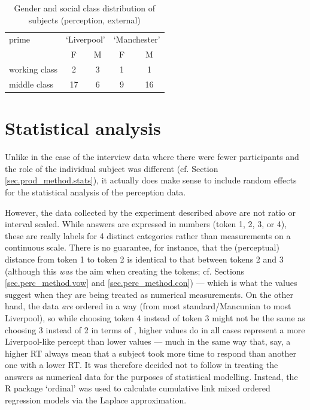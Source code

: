 \begin{table}[h]
	\caption[Gender and {social class} of subjects (perception)]{Gender and {social class} distribution of subjects (perception, external)}
	\label{tab.participants.perception}
	\centering
	\begin{tabular}{lcccc}
		\hline
		prime\is{priming} & \multicolumn{2}{c}{`Liverpool'} & \multicolumn{2}{c}{`Manchester'}\\
		& F & M & F & M\\
		\hline
		working class & 2 & 3 & 1 & 1\\
		middle class & 17 & 6 & 9 & 16\\
		\hline
	\end{tabular}
\end{table}

\section{Statistical analysis}\label{sec.perc_method.stats}

Unlike in the case of the interview data where there were fewer participants and the role of the individual subject was different (cf. Section \ref{sec.prod_method.stats}), it actually does make sense to include random effects for the statistical analysis of the perception data.

However, the data collected by the experiment described above are not ratio or interval scaled.
While answers are expressed in numbers (token 1, 2, 3, or 4), these are really labels for 4 distinct categories rather than measurements on a continuous scale.
There is no guarantee, for instance, that the (perceptual) distance from token 1 to token 2 is identical to that between tokens 2 and 3 (although this \emph{was} the aim when creating the tokens; cf. Sections \ref{sec.perc_method.vow} and \ref{sec.perc_method.con}) --- which is what the values suggest when they are being treated as numerical measurements.
On the other hand, the data \emph{are} ordered in a way (from most standard/Mancunian to most Liverpool), so while choosing token 4 instead of token 3 might not be the same as choosing 3 instead of 2 in terms of , higher values do in all cases represent a more Liverpool-like percept than lower values --- much in the same way that, say, a higher RT always mean that a subject took more time to respond than another one with a lower RT.
It was therefore decided not to follow \textcite{hayetal2006a,haydrager2010} in treating the answers as numerical data for the purposes of statistical modelling.
Instead, the R package `ordinal' \parencite{Rordinal} was used to calculate cumulative link mixed ordered regression models via the Laplace approximation.

